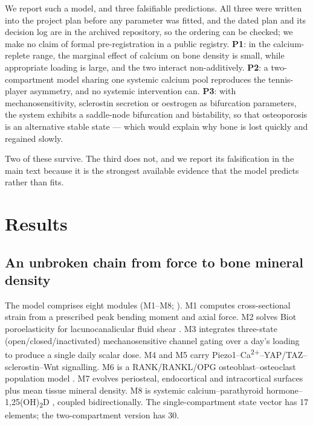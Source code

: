 \documentclass[10pt,letterpaper]{article}
\begin{document}
We report such a model, and three falsifiable predictions. All three were
written into the project plan before any parameter was fitted, and the dated
plan and its decision log are in the archived repository, so the ordering can
be checked; we make no claim of formal pre-registration in a public registry. \textbf{P1}: in the calcium-replete range, the marginal effect
of calcium on bone density is small, while appropriate loading is large, and
the two interact non-additively. \textbf{P2}: a two-compartment model sharing
one systemic calcium pool reproduces the tennis-player asymmetry, and no
systemic intervention can. \textbf{P3}: with mechanosensitivity, sclerostin
secretion or oestrogen as bifurcation parameters, the system exhibits a
saddle-node bifurcation and bistability, so that osteoporosis is an
alternative stable state --- which would explain why bone is lost quickly and
regained slowly.

Two of these survive. The third does not, and we report its falsification in
the main text because it is the strongest available evidence that the model
predicts rather than fits.

\section*{Results}

\subsection*{An unbroken chain from force to bone mineral density}

The model comprises eight modules (M1--M8; ). M1 computes
cross-sectional strain from a prescribed peak bending moment and axial force.
M2 solves Biot poroelasticity for lacunocanalicular fluid shear
\cite{weinbaum1994}. M3 integrates three-state (open/closed/inactivated)
mechanosensitive channel gating \cite{fu2025} over a day's loading to produce
a single daily scalar dose. M4 and M5 carry
Piezo1--Ca\textsuperscript{2+}--YAP/TAZ--sclerostin--Wnt signalling. M6 is a
RANK/RANKL/OPG osteoblast--osteoclast population model
\cite{lemaire2004,pivonka2008}. M7 evolves periosteal, endocortical and
intracortical surfaces plus mean tissue mineral density. M8 is systemic
calcium--parathyroid hormone--1,25(OH)\textsubscript{2}D
\cite{peterson2010}, coupled bidirectionally. The single-compartment state
vector has 17 elements; the two-compartment version has 30.
\end{document}
